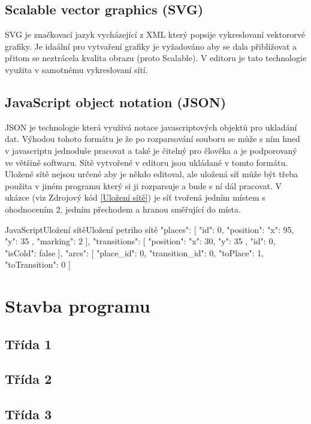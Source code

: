 \documentclass[
  biblatex,
  glossaries,
  index
]{kidiplom}
\begin{document}
\subsection{Scalable vector graphics (SVG)}
SVG je značkovací jazyk vycházející z XML který popsije vykreslovaní 
vektororvé grafiky. Je idaální pro vytvaření grafiky je vyžadováno
aby se dala přibližovat a přitom se neztrácela kvalita obrazu (proto Scalable).
V editoru je tato technologie využita v samotnému vykreslovaní sítí.

\subsection{JavaScript object notation (JSON)}
JSON je technologie která využívá notace javascriptových objektů pro ukladání dat.
Výhodou tohoto formátu je že po rozparsování souboru se může s ním hned v 
javascriptu jednoduše pracovat a také je čitelný pro člověka a je podporovaný ve většině softwaru.
Sítě vytvořené v editoru jsou ukládané v tomto formátu.
Uložené sítě nejsou určené aby je někdo editoval, ale uložená síť může být třeba 
použita v jiném programu který si ji rozparsuje a bude s ní dál pracovat.
V ukázce (viz Zdrojový kód \ref{Uložení sítě}) je síť tvořená jedním místem s ohodnocením 2, 
jedním přechodem a hranou směřující do místa.

\begin{kicode}{JavaScript}{Uložení sítě}{Uložení petriho sítě}
{
  "places": [
    {
      "id": 0,
      "position": {
        "x": 95, "y": 35
      },
      "marking": 2
    }
  ],
  "transitions": [
    {
      "position": {
        "x": 30, "y": 35
      },
      "id": 0,
      "isCold": false
    }
  ],
  "arcs": [
    {
      "place_id": 0,
      "transition_id": 0,
      "toPlace": 1,
      "toTransition": 0
    }
  ]
}
\end{kicode}

\section{Stavba programu}

\subsection{Třída 1}
\subsection{Třída 2}
\subsection{Třída 3}
\end{document}
